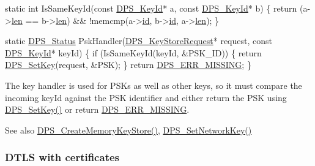 \begin{DoxyCodeInclude}
\textcolor{keyword}{static} \textcolor{keywordtype}{int} IsSameKeyId(\textcolor{keyword}{const} \hyperlink{struct___d_p_s___key_id}{DPS\_KeyId}* a, \textcolor{keyword}{const} \hyperlink{struct___d_p_s___key_id}{DPS\_KeyId}* b)
\{
    \textcolor{keywordflow}{return} (a->\hyperlink{struct___d_p_s___key_id_ad656ed0567e09b47f95776e8af0f29df}{len} == b->\hyperlink{struct___d_p_s___key_id_ad656ed0567e09b47f95776e8af0f29df}{len}) && !memcmp(a->\hyperlink{struct___d_p_s___key_id_a199ba6a4d89e6eab2b1c7f84db7b0e47}{id}, b->\hyperlink{struct___d_p_s___key_id_a199ba6a4d89e6eab2b1c7f84db7b0e47}{id}, a->\hyperlink{struct___d_p_s___key_id_ad656ed0567e09b47f95776e8af0f29df}{len});
\}

\textcolor{keyword}{static} \hyperlink{group__status_ga30395a84d3cad9d4ec29848106415038}{DPS\_Status} PskHandler(\hyperlink{group__keystore_ga7c3e50965b65334e9791780fa855ed16}{DPS\_KeyStoreRequest}* request, \textcolor{keyword}{const} 
      \hyperlink{struct___d_p_s___key_id}{DPS\_KeyId}* keyId)
\{
    \textcolor{keywordflow}{if} (IsSameKeyId(keyId, &PSK\_ID)) \{
        \textcolor{keywordflow}{return} \hyperlink{group__keystore_ga15d6a9b8256b67c2ec8b1d365a98dbab}{DPS\_SetKey}(request, &PSK);
    \}
    \textcolor{keywordflow}{return} \hyperlink{group__status_ga5c46980c33492a8b76bffce081dbcba4}{DPS\_ERR\_MISSING};
\}
\end{DoxyCodeInclude}
The key handler is used for P\+S\+Ks as well as other keys, so it must compare the incoming {\ttfamily key\+Id} against the P\+SK identifier and either return the P\+SK using \hyperlink{group__keystore_ga15d6a9b8256b67c2ec8b1d365a98dbab}{D\+P\+S\+\_\+\+Set\+Key()} or return \hyperlink{group__status_ga5c46980c33492a8b76bffce081dbcba4}{D\+P\+S\+\_\+\+E\+R\+R\+\_\+\+M\+I\+S\+S\+I\+NG}.

\begin{DoxySeeAlso}{See also}
\hyperlink{group__keystore_ga2da4c5f9b7ab5ff6b65d1c8f4d6c30bc}{D\+P\+S\+\_\+\+Create\+Memory\+Key\+Store()}, \hyperlink{group__keystore_ga8664b8c5cc2d3df6512ecb71e7f92212}{D\+P\+S\+\_\+\+Set\+Network\+Key()}
\end{DoxySeeAlso}
\hypertarget{tutorials-security_dtls-with-certificates}{}\subsubsection{D\+T\+L\+S with certificates}\label{tutorials-security_dtls-with-certificates}

